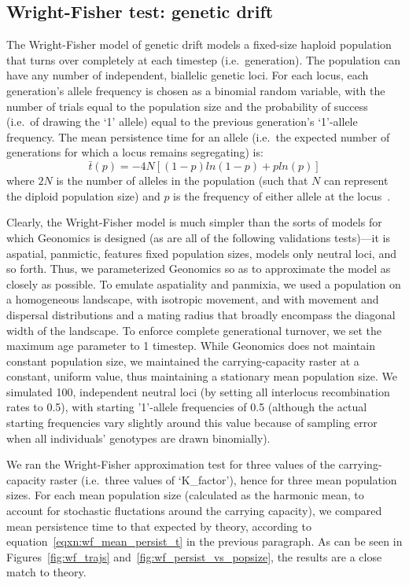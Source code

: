 ﻿\documentclass{article}
\begin{document}
\subsection{Wright-Fisher test: genetic drift}
The Wright-Fisher model of genetic drift models a fixed-size haploid population that
turns over completely at each timestep (i.e.\ generation).
The population can have any number of independent, biallelic genetic loci.
For each locus, each generation’s allele
frequency is chosen as a binomial random variable, with the number of trials equal to
the population size and the probability of success (i.e.\ of drawing the ‘1’ allele)
equal to the previous generation’s ‘1’-allele frequency.
The mean persistence time for an allele 
(i.e.\ the expected number of generations for which a locus remains segregating) 
is:
\begin{equation}
        \bar{t}(p) = -4N[(1 - p)ln(1 - p) + pln(p)]
\label{eqxn:wf_mean_persist_t}
\end{equation}
where $2N$ is the number of alleles in the population (such that $N$ can
represent the diploid population size) and $p$ is the frequency of either allele
at the locus~\cite{wright,fisher,hartl}.

Clearly, the Wright-Fisher model is much simpler than the sorts of models for which
Geonomics is designed (as are all of the following validations tests)---it is aspatial,
panmictic, features fixed population sizes, models only neutral loci, and so forth. 
Thus, we parameterized Geonomics so as to approximate the model as closely as possible.
To emulate aspatiality and panmixia, we used a population on a homogeneous landscape,
with isotropic movement, and with movement and dispersal distributions
and a mating radius that broadly encompass the diagonal width of the landscape.
To enforce complete generational turnover, we set the
maximum age parameter to 1 timestep. While Geonomics does not maintain constant population
size, we maintained the carrying-capacity raster at a constant, uniform value, thus
maintaining a stationary mean population size. We simulated 100, independent neutral
loci (by setting all interlocus recombination rates to 0.5), with starting '1'-allele
frequencies of 0.5 (although the actual starting frequencies vary slightly around
this value because of sampling error when all individuals' genotypes are drawn binomially).

We ran the Wright-Fisher approximation test for three values of the
carrying-capacity raster (i.e.\ three values of `K\_factor'), hence for three mean
population sizes. For each mean population size (calculated as the harmonic mean,
to account for stochastic fluctations around the carrying capacity), we compared
mean persistence time to that
expected by theory, according to equation~\ref{eqxn:wf_mean_persist_t} in the previous paragraph. As can be
seen in Figures~\ref{fig:wf_trajs} and~\ref{fig:wf_persist_vs_popsize}, the results are a close match to theory.
\end{document}

